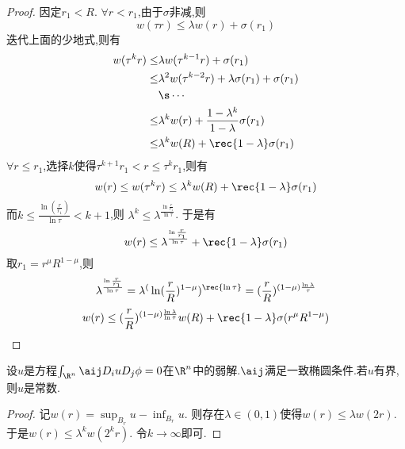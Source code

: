 \begin{proof}
    因定$r_1 < R$. $\forall r < r_1$,由于$\sigma$非减,则
    \begin{equation}
        w(\tau r) \le \lambda w(r)+\sigma(r_1)
    \end{equation}
    迭代上面的少地式,则有
    \begin{equation}
        \begin{split}
            w(\tau^k r) \le& \lambda w(\tau^{k-1}r) +\sigma(r_1) \\
            \le & \lambda^2 w(\tau^{k-2}r)+\lambda\sigma(r_1)+\sigma(r_1)\\
            &\s\cdots\\
            \le & \lambda^kw(r)+\frac{1-\lambda^k}{1-\lambda}\sigma(r_1)\\
            \le &\lambda^kw(R)+\rec{1-\lambda}\sigma(r_1)
        \end{split}
    \end{equation}
    $\forall r \le r_1$,选择$k$使得$\tau^{k+1}r_1< r \le \tau^kr_1$,则有
    \begin{equation}
        w(r) \le w(\tau^k r) \le \lambda^kw(R)+\rec{1-\lambda}\sigma(r_1)
    \end{equation}
    而$k \le \frac{\ln(\frac{r}{r_1})}{\ln \tau} < k+1$,则 $\lambda^k \le \lambda ^{\frac{\ln \frac{r}{r_1}}{\ln \tau}}$. 于是有
    \begin{equation}
        w(r) \le \lambda^{\frac{\ln \frac{r}{r_1}}{\ln \tau}} +\rec{1-\lambda}\sigma(r_1)
    \end{equation}
    取$r_1=r^\mu R^{1-\mu}$,则
    \begin{equation}
        \lambda ^\frac{\ln \frac{r}{r_1}}{\ln \tau}=\lambda^(\ln(\frac{r}{R})^{1-\mu})^\rec{\ln \tau}=(\frac{r}{R})^{(1-\mu)\frac{\ln \lambda}{\tau}}
    \end{equation}
    \begin{equation}
        w(r) \le (\frac{r}{R})^{(1-\mu)\frac{\ln \lambda}{\ln \tau}}w(R)+\rec{1-\lambda}\sigma(r^\mu R^{1-\mu})
    \end{equation}
\end{proof}
\begin{corollary}[Liouville定理]
    设$u$是方程$\int_{\R^n}\aij D_iuD_j\phi=0$在$\R^n$中的弱解.$\aij$满足一致椭圆条件.若$u$有界,则$u$是常数.
\end{corollary}
\begin{proof}
    记$w(r)=\sup_{B_r}u-\inf_{B_r}u$. 则存在$\lambda \in (0,1)$使得$w(r) \le \lambda w(2r)$.于是$w(r) \le \lambda^kw(2^kr)$. 令$k \to \infty$即可.
\end{proof}